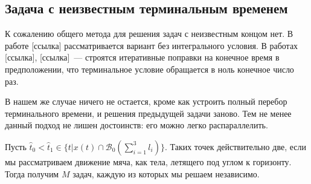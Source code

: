 \subsection{Задача с неизвестным терминальным временем}

К сожалению общего метода для решения задач с неизвестным концом нет.
В работе [ссылка] рассматривается вариант без интегрального условия.
В работах [ссылка], [ссылка]~--- строятся итеративные поправки на конечное время в предположении, что терминальное условие обращается в ноль конечное число раз.

В нашем же случае ничего не остается, кроме как устроить полный перебор терминального времени, и решения предыдущей задачи заново.
Тем не менее данный подход не лишен достоинств: его можно легко распараллелить.

Пусть $\hat t_0 < \hat t_1 \in \{t | x(t) \cap \mathcal{B}_0(\sum_{i=1}^{3}l_i) \}$.
Таких точек действительно две, если мы рассматриваем движение мяча, как тела, летящего под углом к горизонту.
Тогда получим $M$ задач, каждую из которых мы решаем независимо.